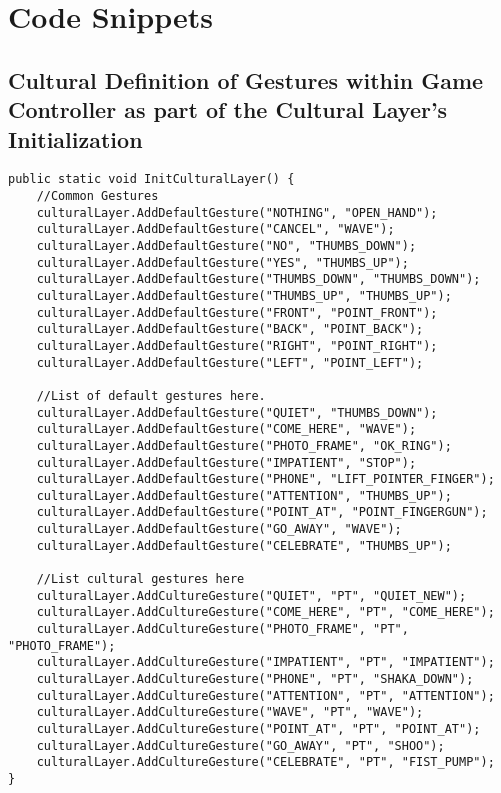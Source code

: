 \chapter{Code Snippets} \label{ap1:CodeSnippets}

\section{Cultural Definition of Gestures within Game Controller as part of the Cultural Layer's Initialization} \label{ap1:InitCulturalLayer}

\begin{lstlisting}
public static void InitCulturalLayer() {
	//Common Gestures
	culturalLayer.AddDefaultGesture("NOTHING", "OPEN_HAND");
	culturalLayer.AddDefaultGesture("CANCEL", "WAVE");
	culturalLayer.AddDefaultGesture("NO", "THUMBS_DOWN");
	culturalLayer.AddDefaultGesture("YES", "THUMBS_UP");
	culturalLayer.AddDefaultGesture("THUMBS_DOWN", "THUMBS_DOWN");
	culturalLayer.AddDefaultGesture("THUMBS_UP", "THUMBS_UP");
	culturalLayer.AddDefaultGesture("FRONT", "POINT_FRONT");
	culturalLayer.AddDefaultGesture("BACK", "POINT_BACK");
	culturalLayer.AddDefaultGesture("RIGHT", "POINT_RIGHT");
	culturalLayer.AddDefaultGesture("LEFT", "POINT_LEFT");

	//List of default gestures here.
	culturalLayer.AddDefaultGesture("QUIET", "THUMBS_DOWN");
	culturalLayer.AddDefaultGesture("COME_HERE", "WAVE");
	culturalLayer.AddDefaultGesture("PHOTO_FRAME", "OK_RING");
	culturalLayer.AddDefaultGesture("IMPATIENT", "STOP");
	culturalLayer.AddDefaultGesture("PHONE", "LIFT_POINTER_FINGER");
	culturalLayer.AddDefaultGesture("ATTENTION", "THUMBS_UP");
	culturalLayer.AddDefaultGesture("POINT_AT", "POINT_FINGERGUN");
	culturalLayer.AddDefaultGesture("GO_AWAY", "WAVE");
	culturalLayer.AddDefaultGesture("CELEBRATE", "THUMBS_UP");

	//List cultural gestures here
	culturalLayer.AddCultureGesture("QUIET", "PT", "QUIET_NEW");
	culturalLayer.AddCultureGesture("COME_HERE", "PT", "COME_HERE");
	culturalLayer.AddCultureGesture("PHOTO_FRAME", "PT", "PHOTO_FRAME");
	culturalLayer.AddCultureGesture("IMPATIENT", "PT", "IMPATIENT");
	culturalLayer.AddCultureGesture("PHONE", "PT", "SHAKA_DOWN");
	culturalLayer.AddCultureGesture("ATTENTION", "PT", "ATTENTION");
	culturalLayer.AddCultureGesture("WAVE", "PT", "WAVE");
	culturalLayer.AddCultureGesture("POINT_AT", "PT", "POINT_AT");
	culturalLayer.AddCultureGesture("GO_AWAY", "PT", "SHOO");
	culturalLayer.AddCultureGesture("CELEBRATE", "PT", "FIST_PUMP");
}
\end{lstlisting}

